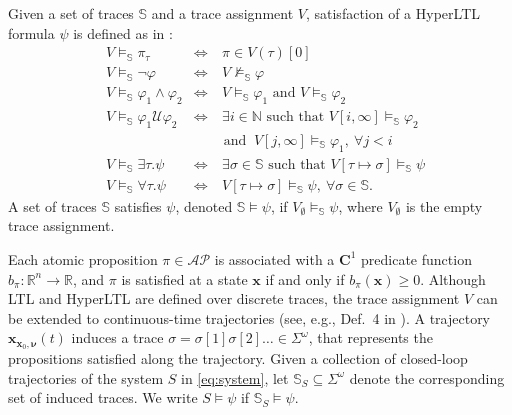 \documentclass[journal,twoside,web]{ieeecolor}
\begin{document}
Given a set of traces $\mathbb{S}$ and a trace assignment $V$, satisfaction of a HyperLTL formula $\psi$ is defined as in \cite{clarkson2014}:
\begin{equation*}
    \begin{aligned}
        &V \models_\mathbb{S} \pi_\tau &\Leftrightarrow& \ \pi \in V(\tau)[0] \\
        &V \models_\mathbb{S} \neg \varphi &\Leftrightarrow& \ V \not\models_\mathbb{S} \varphi \\
        &V \models_\mathbb{S} \varphi_1 \land \varphi_2 &\Leftrightarrow&  \ V \models_\mathbb{S} \varphi_1 \text{ and }  V \models_\mathbb{S} \varphi_2 \\
        &V \models_\mathbb{S} \varphi_1 \mathcal{U} \varphi_2 &\Leftrightarrow& \ \exists i \in \mathbb{N} \text{ such that } V[i, \infty] \models_\mathbb{S} \varphi_2 \\
        & & & \text{ and } \  V[j, \infty] \models_\mathbb{S} \varphi_1, \ \forall j < i \\
        &V \models_\mathbb{S} \exists \tau. \psi &\Leftrightarrow& \ \exists \sigma \in \mathbb{S} \text{ such that } V[\tau \mapsto \sigma] \models_\mathbb{S} \psi \\
        &V \models_\mathbb{S} \forall \tau. \psi &\Leftrightarrow& \ V[\tau \mapsto \sigma] \models_\mathbb{S} \psi, \ \forall \sigma \in \mathbb{S}.
    \end{aligned}
\end{equation*}
A set of traces $\mathbb{S}$ satisfies $\psi$, denoted $\mathbb{S} \models \psi$, if $V_\emptyset \models_{\mathbb{S}} \psi$, where $V_\emptyset$ is the empty trace assignment.

Each atomic proposition $\pi \in \mathcal{AP}$ is associated with a $\mathbf{C}^1$ predicate function $b_\pi: \mathbb{R}^n \to \mathbb{R}$, and $\pi$ is satisfied at a state $\mathbf{x}$ if and only if $b_\pi(\mathbf{x}) \ge 0$. Although LTL and HyperLTL are defined over discrete traces, the trace assignment $V$ can be extended to continuous-time trajectories (see, e.g., Def.~4 in \cite{kloetzer2008}). A trajectory $\mathbf{x}_{\mathbf{x}_0, \boldsymbol{\nu}}(t)$ induces a trace $\sigma = \sigma[1] \sigma[2] \dots \in \Sigma^\omega$, that represents the propositions satisfied along the trajectory. 
Given a collection of closed-loop trajectories of the system $S$ in \eqref{eq:system}, let $\mathbb{S}_S \subseteq \Sigma^\omega$ denote the corresponding set of induced traces. We write $S \models \psi$ if $\mathbb{S}_S \models \psi$.
\end{document}
